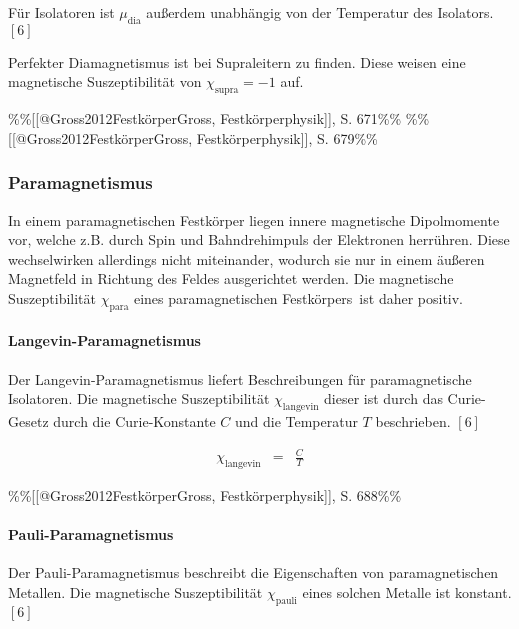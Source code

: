 \documentclass[12pt,a4paper]{scrartcl}
\numberwithin{equation}{section} %
\renewcommand{\[}{} %
\renewcommand{\]}{\noindent} %
\begin{document}
Für Isolatoren ist \(\mu_\mathrm{dia}\) außerdem unabhängig von der
Temperatur des Isolators. \([6]\)

Perfekter Diamagnetismus ist bei Supraleitern zu finden. Diese weisen
eine magnetische Suszeptibilität von \(\chi_\mathrm{supra} = -1\) auf.

\%\%{[}{[}@Gross2012Festkörper\textbar Gross, Festkörperphysik{]}{]}, S.
671\%\% \%\%{[}{[}@Gross2012Festkörper\textbar Gross,
Festkörperphysik{]}{]}, S. 679\%\%

\hypertarget{paramagnetismus}{%
\subsubsection{Paramagnetismus}\label{paramagnetismus}}

In einem paramagnetischen Festkörper liegen innere magnetische
Dipolmomente vor, welche z.B. durch Spin und Bahndrehimpuls der
Elektronen herrühren. Diese wechselwirken allerdings nicht miteinander,
wodurch sie nur in einem äußeren Magnetfeld in Richtung des Feldes
ausgerichtet werden. Die magnetische Suszeptibilität
\(\chi_\mathrm{para}\) eines paramagnetischen Festkörpers~ist daher
positiv.

\hypertarget{langevin-paramagnetismus}{%
\paragraph{Langevin-Paramagnetismus}\label{langevin-paramagnetismus}}

Der Langevin-Paramagnetismus liefert Beschreibungen für paramagnetische
Isolatoren. Die magnetische Suszeptibilität \(\chi_\mathrm{langevin}\)
dieser ist durch das Curie-Gesetz durch die Curie-Konstante \(C\) und
die Temperatur \(T\) beschrieben. \([6]\)

\[
\begin{eqnarray}
    \chi_\mathrm{langevin} &=& \frac{C}{T}
\end{eqnarray}
\]

\%\%{[}{[}@Gross2012Festkörper\textbar Gross, Festkörperphysik{]}{]}, S.
688\%\%

\hypertarget{pauli-paramagnetismus}{%
\paragraph{Pauli-Paramagnetismus}\label{pauli-paramagnetismus}}

Der Pauli-Paramagnetismus beschreibt die Eigenschaften von
paramagnetischen Metallen. Die magnetische Suszeptibilität
\(\chi_\mathrm{pauli}\) eines solchen Metalle ist konstant. \([6]\)
\end{document}
